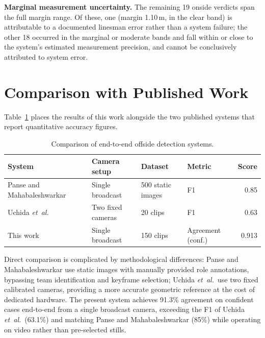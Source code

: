 \textbf{Marginal measurement uncertainty.} The remaining 19 onside verdicts span the full margin range. Of these, one (margin 1.10\,m, in the clear band) is attributable to a documented linesman error rather than a system failure; the other 18 occurred in the marginal or moderate bands and fall within or close to the system's estimated measurement precision, and cannot be conclusively attributed to system error.

\section{Comparison with Published Work}%
\label{sec:eval_comparison}

Table~\ref{tab:comparison} places the results of this work alongside the two published systems that report quantitative accuracy figures.

\begin{table}[htbp]
  \centering
  \caption{Comparison of end-to-end offside detection systems.}
  \label{tab:comparison}
  \small
  \begin{tabular}{p{4.2cm}p{3.2cm}p{2.8cm}p{2.4cm}r}
    \hline
    System & Camera setup & Dataset & Metric & Score \\
    \hline
    Panse and Mahabaleshwarkar~\cite{panse2020dataset} & Single broadcast   & 500 static images & F1                & 0.85 \\
    Uchida \textit{et~al.}~\cite{uchida2021offside}    & Two fixed cameras  & 20 clips          & F1                & 0.63 \\
    This work                                          & Single broadcast   & 150 clips         & Agreement (conf.) & 0.913 \\
    \hline
  \end{tabular}
\end{table}

Direct comparison is complicated by methodological differences: Panse and Mahabaleshwarkar use static images with manually provided role annotations, bypassing team identification and keyframe selection; Uchida \textit{et~al.}\ use two fixed calibrated cameras, providing a more accurate geometric reference at the cost of dedicated hardware. The present system achieves 91.3\% agreement on confident cases end-to-end from a single broadcast camera, exceeding the F1 of Uchida \textit{et~al.}\ (63.1\%) and matching Panse and Mahabaleshwarkar (85\%) while operating on video rather than pre-selected stills.
